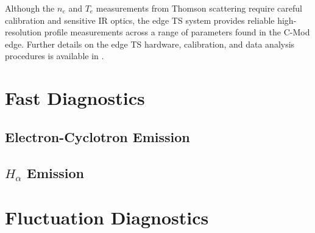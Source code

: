 Although the $n_e$ and $T_e$ measurements from Thomson scattering require careful calibration and sensitive IR optics, the edge TS system provides reliable high-resolution profile measurements across a range of parameters found in the C-Mod edge.  Further details on the edge TS hardware, calibration, and data analysis procedures is available in \cite[\S 3]{Hughes2005}.\nicesectionending

\section{Fast Diagnostics}\label{sec:app_fast}

\subsection{Electron-Cyclotron Emission}\label{subsec:app_ece}

\subsection{$H_\alpha$ Emission}\label{subsec:app_halpha}

\nicesectionending

\section{Fluctuation Diagnostics}\label{sec:app_fluct}

\nicechapterending


